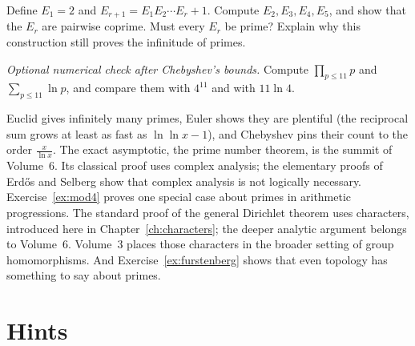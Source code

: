 \begin{exercise}[$\star\star$]\label{ex:t1-euclid-sequence}
Define $E_1=2$ and $E_{r+1}=E_1E_2\cdots E_r+1$. Compute $E_2,E_3,E_4,E_5$, and show that the $E_r$ are pairwise coprime. Must every $E_r$ be prime? Explain why this construction still proves the infinitude of primes.
\end{exercise}

\begin{exercise}[$\star$]\label{ex:t1-prod11}
\emph{Optional numerical check after Chebyshev's bounds.}
Compute $\prod_{p\le 11}p$ and $\sum_{p\le 11}\ln p$, and compare them with $4^{11}$ and with $11\ln 4$.
\end{exercise}

\begin{beauty}
Euclid gives infinitely many primes, Euler shows they are plentiful (the reciprocal sum grows at least as fast as $\ln\ln x-1$), and Chebyshev pins their count to the order $\frac x{\ln x}$. The exact asymptotic, the prime number theorem, is the summit of Volume~6. Its classical proof uses complex analysis; the elementary proofs of Erd\H{o}s and Selberg show that complex analysis is not logically necessary. Exercise~\ref{ex:mod4} proves one special case about primes in arithmetic progressions. The standard proof of the general Dirichlet theorem uses characters, introduced here in Chapter~\ref{ch:characters}; the deeper analytic argument belongs to Volume~6. Volume~3 places those characters in the broader setting of group homomorphisms. And Exercise~\ref{ex:furstenberg} shows that even topology has something to say about primes.
\end{beauty}

\section{Hints}

